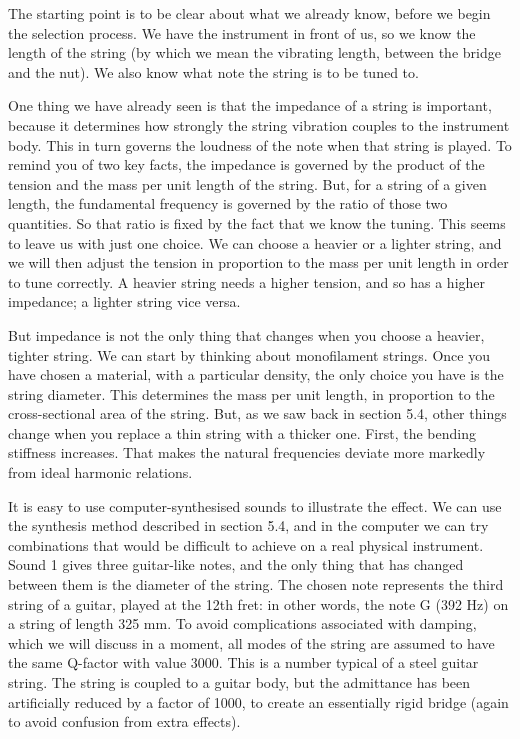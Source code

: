   The starting point is to be clear about what we already know, before we begin 
  the selection process. We have the instrument in front of us, so we know the 
  length of the string (by which we mean the vibrating length, between the 
  bridge and the nut). We also know what note the string is to be tuned to. 

  One thing we have already seen is that the impedance of a string is 
  important, because it determines how strongly the string vibration couples to 
  the instrument body. This in turn governs the loudness of the note when that 
  string is played. To remind you of two key facts, the impedance is governed 
  by the product of the tension and the mass per unit length of the string. 
  But, for a string of a given length, the fundamental frequency is governed by 
  the ratio of those two quantities. So that ratio is fixed by the fact that we 
  know the tuning. This seems to leave us with just one choice. We can choose a 
  heavier or a lighter string, and we will then adjust the tension in 
  proportion to the mass per unit length in order to tune correctly. A heavier 
  string needs a higher tension, and so has a higher impedance; a lighter 
  string vice versa. 

  But impedance is not the only thing that changes when you choose a heavier, 
  tighter string. We can start by thinking about monofilament strings. Once you 
  have chosen a material, with a particular density, the only choice you have 
  is the string diameter. This determines the mass per unit length, in 
  proportion to the cross-sectional area of the string. But, as we saw back in 
  section 5.4, other things change when you replace a thin string with a 
  thicker one. First, the bending stiffness increases. That makes the natural 
  frequencies deviate more markedly from ideal harmonic relations. 

  It is easy to use computer-synthesised sounds to illustrate the effect. We 
  can use the synthesis method described in section 5.4, and in the computer we 
  can try combinations that would be difficult to achieve on a real physical 
  instrument. Sound 1 gives three guitar-like notes, and the only thing that 
  has changed between them is the diameter of the string. The chosen note 
  represents the third string of a guitar, played at the 12th fret: in other 
  words, the note G (392 Hz) on a string of length 325 mm. To avoid 
  complications associated with damping, which we will discuss in a moment, all 
  modes of the string are assumed to have the same Q-factor with value 3000. 
  This is a number typical of a steel guitar string. The string is coupled to a 
  guitar body, but the admittance has been artificially reduced by a factor of 
  1000, to create an essentially rigid bridge (again to avoid confusion from 
  extra effects). 

